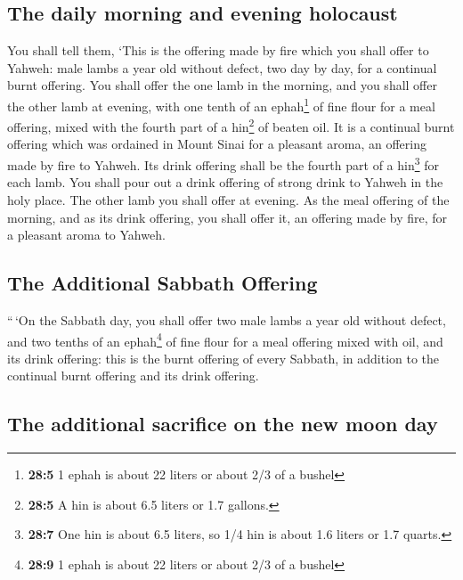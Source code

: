 \hypertarget{the-daily-morning-and-evening-holocaust}{%
\subsection{The daily morning and evening
holocaust}\label{the-daily-morning-and-evening-holocaust}}

 You shall tell them, `This is the offering made by fire
which you shall offer to Yahweh: male lambs a year old without defect,
two day by day, for a continual burnt offering.  You shall
offer the one lamb in the morning, and you shall offer the other lamb at
evening,  with one tenth of an ephah\footnote{\textbf{28:5}
  1 ephah is about 22 liters or about 2/3 of a bushel} of fine flour for
a meal offering, mixed with the fourth part of a hin\footnote{\textbf{28:5}
  A hin is about 6.5 liters or 1.7 gallons.} of beaten oil.
 It is a continual burnt offering which was ordained in
Mount Sinai for a pleasant aroma, an offering made by fire to Yahweh.
 Its drink offering shall be the fourth part of a
hin\footnote{\textbf{28:7} One hin is about 6.5 liters, so 1/4 hin is
  about 1.6 liters or 1.7 quarts.} for each lamb. You shall pour out a
drink offering of strong drink to Yahweh in the holy place.
 The other lamb you shall offer at evening. As the meal
offering of the morning, and as its drink offering, you shall offer it,
an offering made by fire, for a pleasant aroma to Yahweh.

\hypertarget{the-additional-sabbath-offering}{%
\subsection{The Additional Sabbath
Offering}\label{the-additional-sabbath-offering}}

 ``\,`On the Sabbath day, you shall offer two male lambs a
year old without defect, and two tenths of an ephah\footnote{\textbf{28:9}
  1 ephah is about 22 liters or about 2/3 of a bushel} of fine flour for
a meal offering mixed with oil, and its drink offering: 
this is the burnt offering of every Sabbath, in addition to the
continual burnt offering and its drink offering.

\hypertarget{the-additional-sacrifice-on-the-new-moon-day}{%
\subsection{The additional sacrifice on the new moon
day}\label{the-additional-sacrifice-on-the-new-moon-day}}

